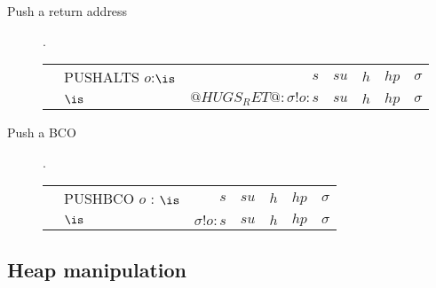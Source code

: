 \documentclass[11pt]{article}
\newcommand{\Subsection}[2]{\subsection{#1}\label{sec:#2}}
\begin{document}
\begin{description}
\item[ Push a return address ].

\begin{tabular}{|llrrrrr|}
\hline
	& PUSHALTS $o$:$\is$	& $s$ 			& $su$ & $h$ & $hp$ & $\sigma$ \\
\next	& $\is$			& $@HUGS_RET@:\sigma!o:s$ 	& $su$ & $h$ & $hp$ & $\sigma$ \\
\hline
\end{tabular}

\item[ Push a BCO ].

\begin{tabular}{|llrrrrr|}
\hline
	& PUSHBCO $o$ : $\is$	& $s$ 			& $su$ & $h$ & $hp$ & $\sigma$ \\
\next	& $\is$			& $\sigma!o : s$ 	& $su$ & $h$ & $hp$ & $\sigma$ \\
\hline
\end{tabular}

\end{description}

\Subsection{Heap manipulation}{hugs-heap-manipulation}
\end{document}
